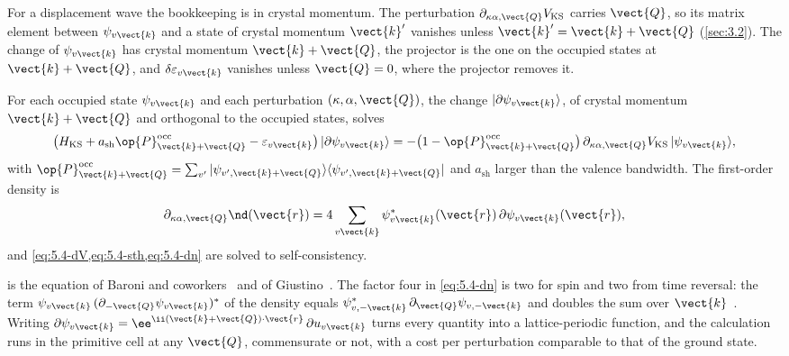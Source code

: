 For a displacement wave the bookkeeping is in crystal momentum. The perturbation $\partial_{\kappa\alpha,\vect{Q}}V_{\mathrm{KS}}$ carries $\vect{Q}$, so its matrix element between $\psi_{v\vect{k}}$ and a state of crystal momentum $\vect{k}'$ vanishes unless $\vect{k}' = \vect{k} + \vect{Q}$ (\cref{sec:3.2}). The change of $\psi_{v\vect{k}}$ has crystal momentum $\vect{k} + \vect{Q}$, the projector is the one on the occupied states at $\vect{k}+\vect{Q}$, and $\delta\varepsilon_{v\vect{k}}$ vanishes unless $\vect{Q} = 0$, where the projector removes it.
\begin{keyresult}
For each occupied state $\psi_{v\vect{k}}$ and each perturbation $(\kappa,\alpha,\vect{Q})$, the change $|\partial\psi_{v\vect{k}}\rangle$, of crystal momentum $\vect{k}+\vect{Q}$ and orthogonal to the occupied states, solves
\begin{equation}
  \bigl(H_{\mathrm{KS}} + a_{\mathrm{sh}}\op{P}^{\mathrm{occ}}_{\vect{k}+\vect{Q}} - \varepsilon_{v\vect{k}}\bigr)\,|\partial\psi_{v\vect{k}}\rangle
  = -\bigl(1 - \op{P}^{\mathrm{occ}}_{\vect{k}+\vect{Q}}\bigr)\,\partial_{\kappa\alpha,\vect{Q}}V_{\mathrm{KS}}\,|\psi_{v\vect{k}}\rangle ,
  \label{eq:5.4-sth}
\end{equation}
with $\op{P}^{\mathrm{occ}}_{\vect{k}+\vect{Q}} = \sum_{v'}|\psi_{v',\vect{k}+\vect{Q}}\rangle\langle\psi_{v',\vect{k}+\vect{Q}}|$ and $a_{\mathrm{sh}}$ larger than the valence bandwidth. The first-order density is
\begin{equation}
  \partial_{\kappa\alpha,\vect{Q}}\nd(\vect{r}) = 4\sum_{v\vect{k}}\psi^*_{v\vect{k}}(\vect{r})\,\partial\psi_{v\vect{k}}(\vect{r}) ,
  \label{eq:5.4-dn}
\end{equation}
and \cref{eq:5.4-dV,eq:5.4-sth,eq:5.4-dn} are solved to self-consistency.
\end{keyresult}
 is the equation of Baroni and coworkers~\cite[Eq.~(31)]{baroni2001phonons} and of Giustino~\cite[Eq.~(48)]{giustino2017electron}. The factor four in \cref{eq:5.4-dn} is two for spin and two from time reversal: the term $\psi_{v\vect{k}}\,(\partial_{-\vect{Q}}\psi_{v\vect{k}})^*$ of the density equals $\psi^*_{v,-\vect{k}}\,\partial_{\vect{Q}}\psi_{v,-\vect{k}}$ and doubles the sum over $\vect{k}$~\cite[Eq.~(35)]{baroni2001phonons}. Writing $\partial\psi_{v\vect{k}} = \ee^{\ii(\vect{k}+\vect{Q})\cdot\vect{r}}\,\partial u_{v\vect{k}}$ turns every quantity into a lattice-periodic function, and the calculation runs in the primitive cell at any $\vect{Q}$, commensurate or not, with a cost per perturbation comparable to that of the ground state.

